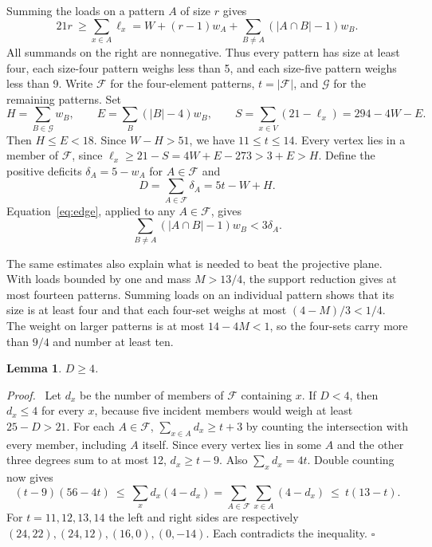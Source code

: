 \documentclass[11pt]{article}
\newtheorem{lemma}[theorem]{Lemma}
\newenvironment{proof}{\par\noindent\textit{Proof.}\ }{\hfill\(\square\)\par}
\newcommand{\F}{\mathcal F}
\newcommand{\G}{\mathcal G}
\begin{document}
Summing the loads on a pattern \(A\) of size \(r\) gives
\begin{equation}\label{eq:edge}
21r\ \ge\sum_{x\in A}\ell_x
= W+(r-1)w_A+\sum_{B\ne A} (|A\cap B|-1)w_B .
\end{equation}
All summands on the right are nonnegative. Thus every pattern has size
at least four, each size-four pattern weighs less than 5, and each
size-five pattern weighs less than 9. Write \(\F\) for the four-element
patterns, \(t=|\F|\), and \(\G\) for the remaining patterns. Set
\[
 H=\sum_{B\in\G}w_B,\qquad E=\sum_B(|B|-4)w_B,\qquad
 S=\sum_{x\in V}(21-\ell_x)=294-4W-E .
\]
Then \(H\le E<18\). Since \(W-H>51\), we have \(11\le t\le14\).
Every vertex lies in a member of \(\F\), since
\(\ell_x\ge21-S=4W+E-273>3+E>H\).
Define the positive deficits \(\delta_A=5-w_A\) for \(A\in\F\) and
\[
 D=\sum_{A\in\F}\delta_A=5t-W+H .
\]
Equation~\eqref{eq:edge}, applied to any \(A\in\F\), gives
\begin{equation}\label{eq:repeats}
 \sum_{B\ne A} (|A\cap B|-1)w_B < 3\delta_A .
\end{equation}

The same estimates also explain what is needed to beat the
projective plane. With loads bounded by one and mass \(M>13/4\),
the support reduction gives at most fourteen patterns. Summing loads
on an individual pattern shows that its size is at least four and that
each four-set weighs at most \((4-M)/3<1/4\). The weight on larger
patterns is at most \(14-4M<1\), so the four-sets carry more than
\(9/4\) and number at least ten.

\begin{lemma}\label{lem:small}
\(D\ge4\).
\end{lemma}
\begin{proof}
Let \(d_x\) be the number of members of \(\F\) containing \(x\).
If \(D<4\), then \(d_x\le4\) for every \(x\), because five incident
members would weigh at least \(25-D>21\). For each \(A\in\F\),
\(\sum_{x\in A} d_x\ge t+3\) by counting the intersection with every
member, including \(A\) itself. Since every vertex lies in some \(A\)
and the other three degrees sum to at most 12, \(d_x\ge t-9\).
Also \(\sum_xd_x=4t\). Double counting now gives
\[
(t-9)(56-4t)\ \le\ \sum_x d_x(4-d_x)
=\sum_{A\in\F}\sum_{x\in A}(4-d_x)\ \le\ t(13-t).
\]
For \(t=11,12,13,14\) the left and right sides are respectively
\((24,22),(24,12),(16,0),(0,-14)\). Each contradicts the inequality.
\end{proof}
\end{document}
